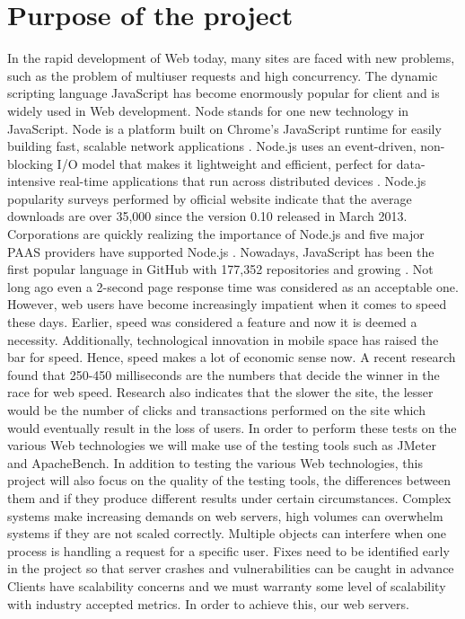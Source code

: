 \documentclass[../thesis.tex]{subfiles}
\begin{document}
\section{Purpose of the project}
In the rapid development of Web today, many sites are faced with new problems, such as the problem of multiuser requests and high concurrency. The dynamic scripting language JavaScript has become enormously popular for client and is widely used in Web development. Node stands for one new technology in JavaScript. Node is a platform built on Chrome's JavaScript runtime for easily building fast, scalable network applications \cite{server}. Node.js uses an event-driven, non- blocking I/O model that makes it lightweight and efficient, perfect for data-intensive real-time applications that run across distributed devices \cite{server}. Node.js popularity surveys performed by official website indicate that the average downloads are over 35,000 since the version 0.10 released in March 2013. Corporations are quickly realizing the importance of Node.js and five major PAAS providers have supported Node.js \cite{node}. Nowadays, JavaScript has been the first popular language in GitHub with 177,352 repositories and growing \cite{github-js}. 
\vspace{5mm}
Not long ago even a 2-second page response time was considered as an acceptable one. However, web users have become increasingly impatient when it comes to speed these days. Earlier, speed was considered a feature and now it is deemed a necessity. Additionally, technological innovation in mobile space has raised the bar for speed. Hence, speed makes a lot of economic sense now. A recent research found that 250-450 milliseconds are the numbers that decide the winner in the race for web speed. Research also indicates that the slower the site, the lesser would be the number of clicks and transactions performed on the site which would eventually result in the loss of users.
\vspace{5mm}
In order to perform these tests on the various Web technologies we will make use of the testing tools such as JMeter and ApacheBench. In addition to testing the various Web technologies, this project will also focus on the quality of the testing tools, the differences between them and if they produce different results under certain circumstances. Complex systems make increasing demands on web servers, high volumes can overwhelm systems if they are not scaled correctly. Multiple objects can interfere when one process is handling a request for a specific user. Fixes need to be identified early in the project so that server crashes and vulnerabilities can be caught in advance Clients have scalability concerns and we must warranty some level of scalability with industry accepted metrics. In order to achieve this, our web servers.
\end{document}

